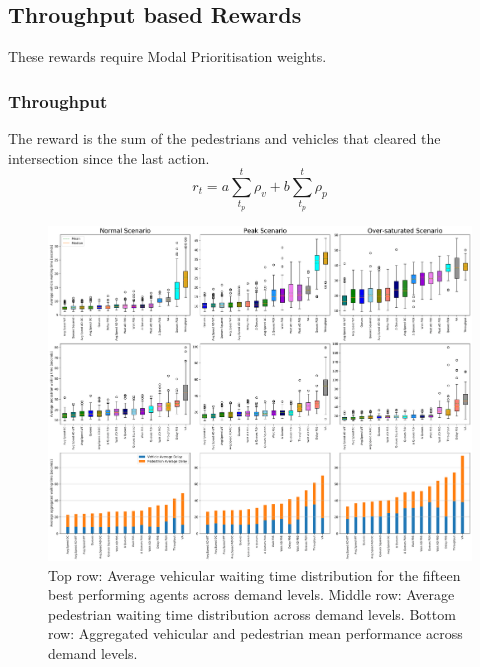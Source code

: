 \documentclass[a4paper, conference]{IEEEtran}
\begin{document}
\subsection{Throughput based Rewards}
These rewards require Modal Prioritisation weights.
\subsubsection{Throughput}
The reward is the sum of the pedestrians and vehicles that cleared the intersection since the last action.
\begin{equation}
    r_t = a \sum_{t_p}^t \rho_v + b \sum_{t_p}^t \rho_p
\label{eq:throughput}
\end{equation}
\begin{figure}                                                
\centering                                                    
\includegraphics[width=\textwidth]{9grid_ordered_boxplot_all.png}                                    
\caption{Top row: Average vehicular waiting time distribution for the fifteen best performing agents across demand levels. Middle row: Average pedestrian waiting time distribution across demand levels. Bottom row: Aggregated vehicular and pedestrian mean performance across demand levels.}                                  
\label{fig:results_9_grid}    
                                          
\end{figure}
\end{document}
